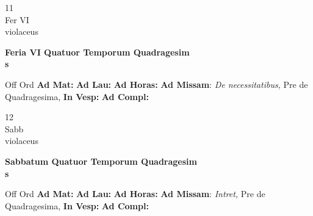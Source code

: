 \documentclass[10pt, openany]{book}
\begin{document}
        \begin{center}
            \begin{minipage}{3.5in}
                \vspace{2em}
                \begin{minipage}{0.5in}
                    {\Huge 11} \\
                    {\normalsize Fer VI} \\
                    {\normalsize violaceus}
                \end{minipage}
                \begin{minipage}{3.0in}
                    \textbf{ \large Feria VI Quatuor Temporum Quadragesim \\
                    \textnormal{\normalsize s}} \\ 
                \end{minipage}
                \begin{justify}Off Ord
                    \textbf{Ad Mat: }
                    \textbf{Ad Lau: }
                    \textbf{Ad Horas: }\textbf{Ad Missam}: \textit{De necessitatibus,} Pre de Quadragesima,  
                    \textbf{In Vesp: }
                    \textbf{Ad Compl: }
                \end{justify}
            \end{minipage}
        \end{center}
    
        \begin{center}
            \begin{minipage}{3.5in}
                \vspace{2em}
                \begin{minipage}{0.5in}
                    {\Huge 12} \\
                    {\normalsize Sabb} \\
                    {\normalsize violaceus}
                \end{minipage}
                \begin{minipage}{3.0in}
                    \textbf{ \large Sabbatum Quatuor Temporum Quadragesim \\
                    \textnormal{\normalsize s}} \\ 
                \end{minipage}
                \begin{justify}Off Ord
                    \textbf{Ad Mat: }
                    \textbf{Ad Lau: }
                    \textbf{Ad Horas: }\textbf{Ad Missam}: \textit{Intret,} Pre de Quadragesima,  
                    \textbf{In Vesp: }
                    \textbf{Ad Compl: }
                \end{justify}
            \end{minipage}
        \end{center}
    
\end{document}
